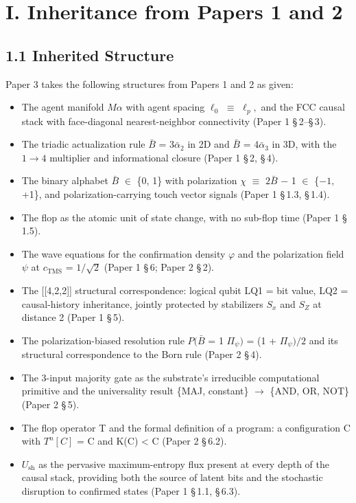 \documentclass[11pt,oneside]{report}
\theoremstyle{definition}
\theoremstyle{remark}
\begin{document}
\section*{I. Inheritance from Papers 1 and 2}

\subsection*{1.1 Inherited Structure}

Paper 3 takes the following structures from Papers 1 and 2 as given:

\begin{itemize}
\item
  The agent manifold \ensuremath{M\alpha} with agent spacing \ensuremath{\ell_{0}} \ensuremath{\equiv} \ensuremath{\ell_{p},} and the FCC causal
  stack with face-diagonal nearest-neighbor connectivity (Paper 1
  \S\,2--\S\,3).
\item
  The triadic actualization rule \ensuremath{\bar{B}} = \ensuremath{3\bar{\alpha}_{2}} in 2D and \ensuremath{\bar{B}} = \ensuremath{4\bar{\alpha}_{3}} in 3D, with
  the \ensuremath{1\to 4} multiplier and informational closure (Paper 1 \S\,2, \S\,4).
\item
  The binary alphabet \ensuremath{\bar{B}} \ensuremath{\in} \{0, 1\} with polarization \ensuremath{\chi} \ensuremath{\equiv} \ensuremath{2\bar{B}} \ensuremath{-} 1 \ensuremath{\in} \{\ensuremath{-1,}
  +1\}, and polarization-carrying touch vector signals (Paper 1 \S\,1.3,
  \S\,1.4).
\item
  The flop as the atomic unit of state change, with no sub-flop time
  (Paper 1 \S\,1.5).
\item
  The wave equations for the confirmation density \ensuremath{\varphi} and the polarization
  field \ensuremath{\psi} at \ensuremath{c_{\mathrm{TMS}}} = \ensuremath{1/\sqrt{2}} (Paper 1 \S\,6; Paper 2 \S\,2).
\item
  The [[4,2,2]] structural correspondence: logical qubit LQ1 =
  bit value, LQ2 = causal-history inheritance, jointly protected by
  stabilizers \ensuremath{S_{x}} and \ensuremath{S_{Z}} at distance 2 (Paper 1 \S\,5).
\item
  The polarization-biased resolution rule \ensuremath{P(\bar{B}} = 1 \textbar{} \ensuremath{\Pi_{\psi})} = (1
  + \ensuremath{\Pi_{\psi})/2} and its structural correspondence to the Born rule (Paper 2
  \S\,4).
\item
  The 3-input majority gate as the substrate's irreducible computational
  primitive and the universality result \{MAJ, constant\} \ensuremath{\to} \{AND, OR,
  NOT\} (Paper 2 \S\,5).
\item
  The flop operator T and the formal definition of a program: a
  configuration C with \ensuremath{T^{n}[C]} = C and K(C) \textless{}
  \textbar C\textbar{} (Paper 2 \S\,6.2).
\item
  \ensuremath{U_{\mathrm{sh}}} as the pervasive maximum-entropy flux present at every depth of
  the causal stack, providing both the source of latent bits and the
  stochastic disruption to confirmed states (Paper 1 \S\,1.1, \S\,6.3).
\end{itemize}
\end{document}

